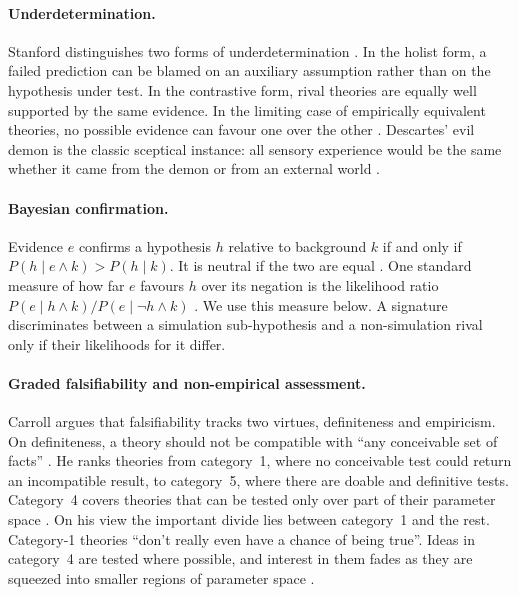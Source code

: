 \paragraph{Underdetermination.}
Stanford distinguishes two forms of underdetermination
\cite{Stanford2023underdetermination}. In the holist form, a failed prediction
can be blamed on an auxiliary assumption rather than on the hypothesis under
test. In the contrastive form, rival theories are equally well supported by
the same evidence. In the limiting case of empirically equivalent theories, no
possible evidence can favour one over the other
\cite{Stanford2023underdetermination}. Descartes' evil demon is the classic
sceptical instance: all sensory experience would be the same whether it came
from the demon or from an external world \cite{Stanford2023underdetermination}.

\paragraph{Bayesian confirmation.}
Evidence $e$ confirms a hypothesis $h$ relative to background $k$ if and only if
$P(h\mid e\wedge k)>P(h\mid k)$. It is neutral if the two are equal
\cite{Crupi2025confirmation}. One standard measure of how far $e$ favours $h$
over its negation is the likelihood ratio
$P(e\mid h\wedge k)/P(e\mid \neg h\wedge k)$ \cite{Crupi2025confirmation}.
We use this measure below. A signature discriminates between a simulation
sub-hypothesis and a non-simulation rival only if their likelihoods for it
differ.

\paragraph{Graded falsifiability and non-empirical assessment.}
Carroll argues that falsifiability tracks two virtues, definiteness and
empiricism. On definiteness, a theory should not be compatible with ``any
conceivable set of facts'' \cite{Carroll2019beyond}. He ranks theories from
category~1, where no conceivable test could return an incompatible result, to
category~5, where there are doable and definitive tests. Category~4 covers
theories that can be tested only over part of their parameter space
\cite{Carroll2019beyond}. On his view the important divide lies between
category~1 and the rest. Category-1 theories ``don't really even have a chance
of being true''. Ideas in category~4 are tested where possible, and interest in
them fades as they are squeezed into smaller regions of parameter space
\cite{Carroll2019beyond}.

